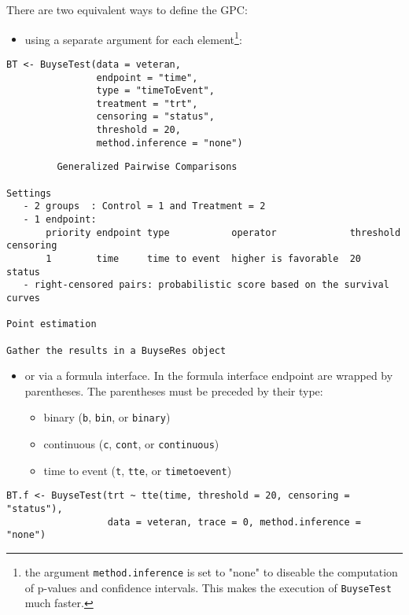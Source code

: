 \documentclass[12pt]{article}
\begin{document}
\bigskip

There are two equivalent ways to define the GPC: 
\begin{itemize}
\item using a separate argument for each element\footnote{the argument
\texttt{method.inference} is set to "none" to diseable the computation of
p-values and confidence intervals. This makes the execution of
\texttt{BuyseTest} much faster.}:
\end{itemize}

\lstset{language=r,label= ,caption= ,captionpos=b,numbers=none}
\begin{lstlisting}
BT <- BuyseTest(data = veteran, 
				endpoint = "time", 
				type = "timeToEvent", 
				treatment = "trt", 
				censoring = "status", 
				threshold = 20,
				method.inference = "none")
\end{lstlisting}

\begin{verbatim}
         Generalized Pairwise Comparisons

Settings 
   - 2 groups  : Control = 1 and Treatment = 2
   - 1 endpoint: 
       priority endpoint type           operator             threshold censoring
       1        time     time to event  higher is favorable  20        status   
   - right-censored pairs: probabilistic score based on the survival curves 

Point estimation

Gather the results in a BuyseRes object
\end{verbatim}

\clearpage

\begin{itemize}
\item or via a formula interface. In the formula interface endpoint are
wrapped by parentheses. The parentheses must be preceded by their
type: 
\begin{itemize}[label={-}]
\item binary (\texttt{b}, \texttt{bin}, or \texttt{binary})
\item continuous (\texttt{c}, \texttt{cont}, or  \texttt{continuous})
\item time to event (\texttt{t}, \texttt{tte}, or \texttt{timetoevent})
\end{itemize}
\end{itemize}

\lstset{language=r,label= ,caption= ,captionpos=b,numbers=none}
\begin{lstlisting}
BT.f <- BuyseTest(trt ~ tte(time, threshold = 20, censoring = "status"),
				  data = veteran, trace = 0, method.inference = "none")
\end{lstlisting}
\end{document}
